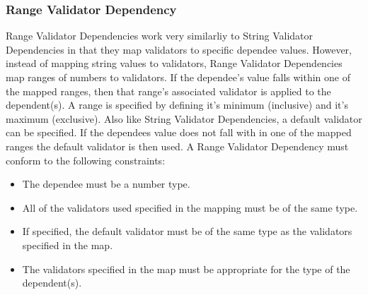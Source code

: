 \subsubsection{Range Validator Dependency}
Range Validator Dependencies work very similarliy to String Validator Dependencies in that they map validators to specific dependee values. However,
instead of mapping string values to validators, Range Validator Dependencies map ranges of numbers to validators. If the dependee's value falls within one of the 
mapped ranges, then that range's associated validator is applied to the dependent(s). A range is specified by defining it's minimum (inclusive) and it's maximum (exclusive).
Also like String Validator Dependencies, a default validator can be specified. If the dependees value does not fall with in one of the mapped ranges the default validator is 
then used. A Range Validator Dependency must conform to the following constraints:
\begin{itemize}
\item The dependee must be a number type.
\item All of the validators used specified in the mapping must be of the same type.
\item If specified, the default validator must be of the same type as the validators specified in the map.
\item The validators specified in the map must be appropriate for the type of the dependent(s).
\end{itemize}

